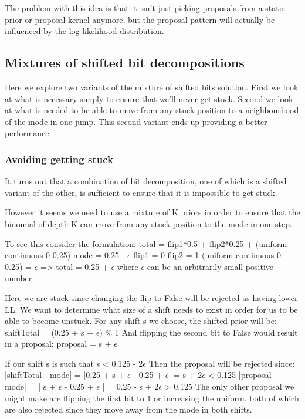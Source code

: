 The problem with this idea is that it isn't just picking proposals from a static prior or proposal kernel anymore, but the proposal pattern will actually be influenced by the log likelihood distribution. 

\subsection{Mixtures of shifted bit decompositions}

Here we explore two variants of the mixture of shifted bits solution. First we look at what is necessary simply to ensure that we'll never get stuck. Second we look at what is needed to be able to move from any stuck position to a neighbourhood of the mode in one jump. This second variant ends up providing a better performance.

\subsubsection{Avoiding getting stuck}

It turns out that a combination of bit decomposition, one of which is a shifted variant of the other, is sufficient to ensure that it is impossible to get stuck.

However it seems we need to use a mixture of K priors in order to ensure that the binomial of depth K can move from any stuck position to the mode in one step. 

To see this consider the formulation:
total = flip1*0.5 + flip2*0.25 + (uniform-continuous 0 0.25)
mode = 0.25 - $\epsilon$
flip1 = 0
flip2 = 1
(uniform-continuous 0 0.25) = $\epsilon$ 
=> total = 0.25 + $\epsilon$
where $\epsilon$ can be an arbitrarily small positive number

Here we are stuck since changing the flip to False will be rejected as having lower LL. We want to determine what size of a shift needs to exist in order for us to be able to become unstuck.
For any shift s we choose, the shifted prior will be:
shiftTotal = (0.25 + s + $\epsilon$) \% 1 
And flipping the second bit to False would result in a proposal:
proposal = s + $\epsilon$

If our shift s is such that 
s < 0.125 - 2$\epsilon$
Then the proposal will be rejected since:
|shiftTotal - mode| = |0.25 + s + $\epsilon$ - 0.25 + $\epsilon$| = s + 2$\epsilon$ < 0.125
|proposal - mode| = | s + $\epsilon$ - 0.25 + $\epsilon$ | = 0.25 - s + 2$\epsilon$ > 0.125
The only other proposal we might make are flipping the first bit to 1 or increasing the uniform, both of which are also rejected since they move away from the mode in both shifts.

